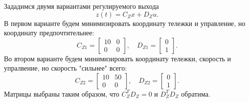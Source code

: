 Зададимся двумя вариантами регулируемого выхода
\begin{equation}
    z(t)=C_Zx+D_Zu.
\end{equation}
В первом варианте будем минимизировать координату тележки и управление, но 
координату предпочтительнее:
\begin{equation*}
    C_{Z1}=\begin{bmatrix}
        10 & 0 \\
        0 & 0
    \end{bmatrix},\quad
    D_{Z1}=\begin{bmatrix}
        0 \\
        1
    \end{bmatrix}.
\end{equation*}
Во втором варианте будем минимизировать координату тележки, скорость и упралвение, но 
скорость "сильнее" всего:
\begin{equation*}
    C_{Z2}=\begin{bmatrix}
        10 & 50 \\
        0 & 0
    \end{bmatrix},\quad
    D_{Z2}=\begin{bmatrix}
        0 \\
        1
    \end{bmatrix}.
\end{equation*}
Матрицы выбраны таким образом, что $C_Z^TD_Z=0$ и $D_Z^TD_Z$ обратима.

